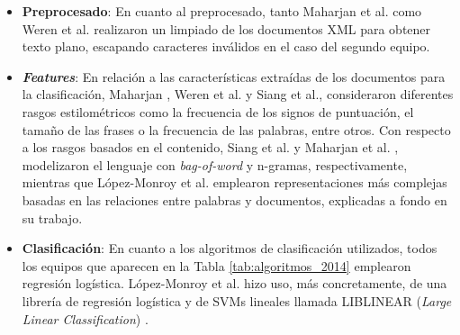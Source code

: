 \begin{itemize}
	\item \textbf{Preprocesado}: En cuanto al preprocesado, tanto Maharjan et al. \cite{maharjan2014simple} como Weren et al. \cite{weren2014exploring} realizaron un limpiado de los documentos XML para obtener
	texto plano, escapando caracteres inválidos en el caso del segundo equipo.
	\item \textbf{\textit{Features}}: En relación a las características extraídas de los documentos para la clasificación, Maharjan \cite{maharjan2014simple}, Weren et al. \cite{weren2014exploring} y Siang et al.,
	consideraron diferentes rasgos estilométricos como la frecuencia de los signos de puntuación, el tamaño de las frases o la frecuencia de las palabras, entre otros. Con respecto 
	a los rasgos basados en el contenido, Siang et al. y Maharjan et al. \cite{maharjan2014simple}, modelizaron el lenguaje con \textit{bag-of-word} y n-gramas, respectivamente, mientras
	que López-Monroy et al. \cite{lopez2014using} emplearon representaciones más complejas basadas en las relaciones entre palabras y documentos, explicadas a fondo
	en su trabajo.
	\item \textbf{Clasificación}: En cuanto a los algoritmos de clasificación utilizados, todos los equipos que aparecen en la Tabla \ref{tab:algoritmos_2014} emplearon regresión logística. López-Monroy et al. \cite{lopez2014using}
	hizo uso, más concretamente, de una librería de regresión logística y de SVMs lineales llamada LIBLINEAR (\textit{Large Linear Classification}) \cite{fan2008liblinear}.
\end{itemize}

